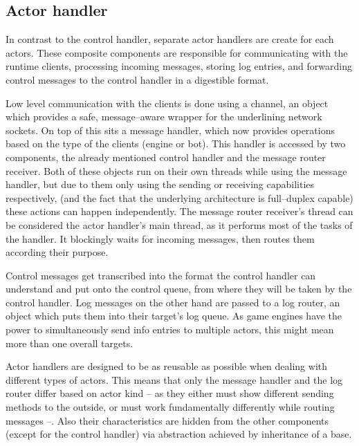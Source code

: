		\subsection{Actor handler}

		In contrast to the control handler, separate actor handlers are create for each actors. These composite components are responsible for communicating with the runtime clients, processing incoming messages, storing log entries, and forwarding control messages to the control handler in a digestible format.
		
		Low level communication with the clients is done using a channel, an object which provides a safe, message--aware wrapper for the underlining network sockets. On top of this sits a message handler, which now provides operations based on the type of the clients (engine or bot). This handler is accessed by two components, the already mentioned control handler and the message router receiver. Both of these objects run on their own threads while using the message handler, but due to them only using the sending or receiving capabilities respectively, (and the fact that the underlying architecture is full--duplex capable) these actions can happen independently. The message router receiver's thread can be considered the actor handler's main thread, as it performs most of the tasks of the handler. It blockingly waits for incoming messages, then routes them according their purpose. 

		Control messages get transcribed into the format the control handler can understand and put onto the control queue, from where they will be taken by the control handler. Log messages on the other hand are passed to a log router, an object which puts them into their target's log queue. As game engines have the power to simultaneously send info entries to multiple actors, this might mean more than one overall targets.
		
		Actor handlers are designed to be as reusable as possible when dealing with different types of actors. This means that only the message handler and the log router differ based on actor kind -- as they either must show different sending methods to the outside, or must work fundamentally differently while routing messages --. Also their characteristics are hidden from the other components (except for the control handler) via abstraction achieved by inheritance of a base. 

